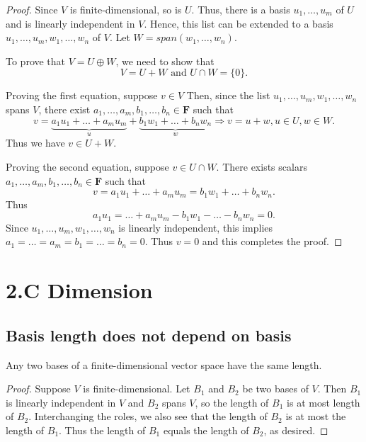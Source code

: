 \documentclass[11pt]{article}
\begin{document}
    \begin{proof}
        Since $V$ is finite-dimensional, so is $U$. Thus, there is a basis \(u_1, \dots, u_m\) of $U$ and is linearly independent in $V$. Hence, this list can be extended to a basis \(u_1, \dots, u_m, w_1, \dots, w_n\) of $V$. Let \(W = span(w_1, \dots, w_n)\).
        
        \vspace{1em}

        To prove that \(V = U \oplus W\), we need to show that \[V = U + W \text{ and } U \cap W = \{0\}.\]

        Proving the first equation, suppose \(v \in V\) Then, since the list \(u_1, \dots, u_m, w_1, \dots, w_n\) spans $V$, there exist \(a_1, \dots, a_m, b_1, \dots, b_n \in \textbf{F}\) such that 
        \begin{equation*}
            v = \underbrace{a_1u_1 + \dots + a_m u_m}_{u} + \underbrace{b_1 w_1 + \dots + b_n w_n}_{w} \Rightarrow v = u + w, u \in U, w \in W.
        \end{equation*}
        Thus we have \(v \in U + W\).

        Proving the second equation, suppose \(v \in U \cap W\). There exists scalars \(a_1, \dots, a_m, b_1, \dots, b_n \in \textbf{F}\) such that \[ v = a_1 u_1 + \dots + a_m u_m = b_1 w_1 + \dots + b_n w_n. \] Thus \[a_1 u_1 = \dots + a_m u_m - b_1 w_1 - \dots - b_n w_n = 0.\] Since \(u_1, \dots, u_m, w_1, \dots, w_n\) is linearly independent, this implies \(a_1 = \dots = a_m = b_1 = \dots = b_n = 0.\) Thus \(v = 0\) and this completes the proof.
    \end{proof}

    \pagebreak

    \section{2.C Dimension}

    \subsection{Basis length does not depend on basis}

    Any two bases of a finite-dimensional vector space have the same length.

    \begin{proof}
        Suppose $V$ is finite-dimensional. Let $B_1$ and $B_2$ be two bases of $V$. Then $B_1$ is linearly independent in $V$ and $B_2$ spans $V$, so the length of $B_1$ is at most length of $B_2$. Interchanging the roles, we also see that the length of $B_2$ is at most the length of $B_1$. Thus the length of $B_1$ equals the length of $B_2$, as desired.
    \end{proof}
\end{document}
